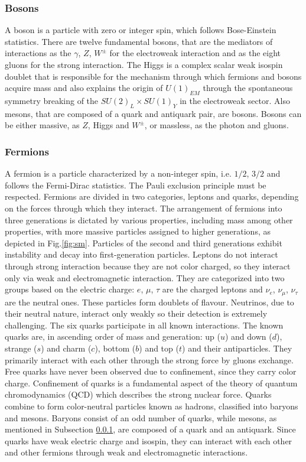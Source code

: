 \subsubsection{Bosons}\label{bosons}
A boson is a particle with zero or integer spin, which follows Bose-Einstein statistics.
There are twelve fundamental bosons, that are the mediators of interactions as the $\gamma$, $Z$, $W^{\pm}$ for the electroweak interaction and as the eight gluons for the strong interaction.
The Higgs is a complex scalar weak isospin doublet that is responsible for the mechanism through which fermions and
bosons acquire mass and also explains the origin of $U (1)_{EM}$ through the spontaneous
symmetry breaking of the $SU (2)_L \times SU (1)_Y$ in the electroweak sector. Also mesons, that are composed of a quark and antiquark pair, are bosons. Bosons can be either massive, as $Z$, Higgs and $W^{\pm}$, or massless, as the photon and gluons.

\subsubsection{Fermions}
A fermion is a particle characterized by a non-integer spin, i.e. $1/2$, $3/2$ and follows the Fermi-Dirac statistics. The Pauli exclusion principle must be respected. Fermions are divided in two categories, leptons and quarks, depending on the forces through which they interact.  The arrangement of fermions into three generations is dictated by various properties, including mass among other properties, with more massive particles assigned to higher generations, as depicted in Fig.\ref{fig:sm}. Particles of the second and third generations exhibit instability and decay into first-generation particles. Leptons do not interact through strong interaction because they are not color charged, so they interact only via weak and electromagnetic interaction. They are categorized into two groups based on the electric charge: $e$, $\mu$, $\tau$ are the charged leptons and $\nu_e$, $\nu_{\mu}$, $\nu_{\tau}$ are the neutral ones. These particles form doublets of flavour. Neutrinos, due to their neutral nature, interact only weakly so their detection is extremely challenging. The six quarks participate in all known interactions. The known quarks are, in ascending order of mass and generation: up ($u$) and down ($d$), strange ($s$) and charm ($c$), bottom ($b$) and top ($t$) and their antiparticles. They primarily interact with each other through the strong force by gluons exchange. Free quarks have never been observed due to confinement, since they carry color charge. Confinement of quarks is a fundamental aspect of the theory of quantum chromodynamics (QCD) which describes the strong nuclear force. Quarks combine to form color-neutral particles known as hadrons, classified into baryons and mesons. Baryons consist of an odd number of quarks, while mesons, as mentioned in Subsection \ref{bosons}, are composed of a quark and an antiquark. Since quarks have weak electric charge and isospin, they can interact with each other and other fermions through weak and electromagnetic interactions.

